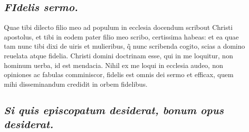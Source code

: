 \documentclass{article}
\begin{document}
\begin{pages}
\subsection*{\textit{\huge\textbf{F}\normalsize Idelis sermo. }}\pstart Quae tibi dilecto filio meo ad populum in ecclesia docendum scribout Christi apostolus, et tibi in eodem pater filio meo scribo, certissima habeas: et ea quae tam nunc tibi dixi de uiris et mulieribus, q̃ nunc scribenda cogito, scias a domino reuelata atque  fidelia. Christi domini doctrinam esse, qui in me loquitur, non hominum uerba, id est mendacia. Nihil ex me loqui in ecclesia audeo, non opiniones ac fabulas comminiscor, fidelis est omnis dei sermo et efficax, quem mihi disseminandum credidit in orbem fidelibus.  \pend
{}
{}
\subsection*{\textit{Si quis episcopatum desiderat, bonum opus desiderat. }}
\endnumbering
\end{pages}
\end{document}
